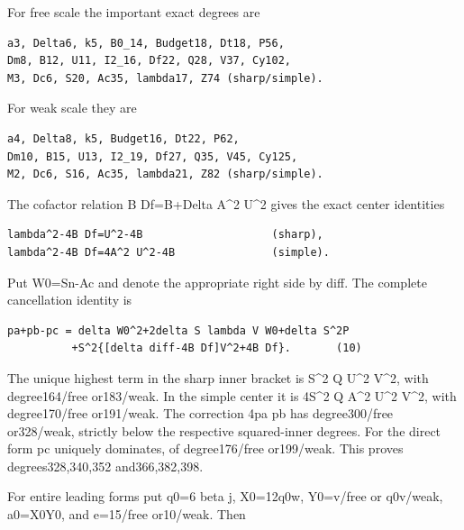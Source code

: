 For free scale the important exact degrees are



\begin{verbatim}
a3, Delta6, k5, B0_14, Budget18, Dt18, P56,
Dm8, B12, U11, I2_16, Df22, Q28, V37, Cy102,
M3, Dc6, S20, Ac35, lambda17, Z74 (sharp/simple).
\end{verbatim}

For weak scale they are



\begin{verbatim}
a4, Delta8, k5, Budget16, Dt22, P62,
Dm10, B15, U13, I2_19, Df27, Q35, V45, Cy125,
M2, Dc6, S16, Ac35, lambda21, Z82 (sharp/simple).
\end{verbatim}

The cofactor relation B Df=\allowbreak{}B+\allowbreak{}Delta A\textasciicircum{}\allowbreak{}2 U\textasciicircum{}\allowbreak{}2 gives the exact center identities



\begin{verbatim}
lambda^2-4B Df=U^2-4B                    (sharp),
lambda^2-4B Df=4A^2 U^2-4B               (simple).
\end{verbatim}

Put W0=\allowbreak{}Sn-Ac and denote the appropriate right side by diff. The complete cancellation identity is



\begin{verbatim}
pa+pb-pc = delta W0^2+2delta S lambda V W0+delta S^2P
          +S^2{[delta diff-4B Df]V^2+4B Df}.       (10)
\end{verbatim}

The unique highest term in the sharp inner bracket is S\textasciicircum{}\allowbreak{}2 Q U\textasciicircum{}\allowbreak{}2 V\textasciicircum{}\allowbreak{}2, with degree164/\allowbreak{}free or183/\allowbreak{}weak. In the simple center it is 4S\textasciicircum{}\allowbreak{}2 Q A\textasciicircum{}\allowbreak{}2 U\textasciicircum{}\allowbreak{}2 V\textasciicircum{}\allowbreak{}2, with degree170/\allowbreak{}free or191/\allowbreak{}weak. The correction 4pa pb has degree300/\allowbreak{}free or328/\allowbreak{}weak, strictly below the respective squared-inner degrees. For the direct form pc uniquely dominates, of degree176/\allowbreak{}free or199/\allowbreak{}weak. This proves degrees328,340,352 and366,382,398.



For entire leading forms put q0=\allowbreak{}6 beta j, X0=\allowbreak{}12q0w, Y0=\allowbreak{}v/\allowbreak{}free or q0v/\allowbreak{}weak, a0=\allowbreak{}X0Y0, and e=\allowbreak{}15/\allowbreak{}free or10/\allowbreak{}weak. Then




